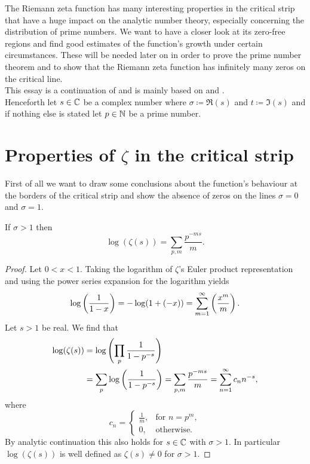 The Riemann zeta function has many interesting properties in the critical strip that have a huge impact on the analytic number theory, especially concerning the distribution of prime numbers. We want to have a closer look at its zero-free regions and find good estimates of the function's growth under certain circumstances. These will be needed later on in order to prove the prime number theorem and to show that the Riemann zeta function has infinitely many zeros on the critical line. \\
This essay is a continuation of \cite{Jesacher2016} and is mainly based on \cite{Stein2003} and \cite{Titchmarsh1986}. \\
Henceforth let $s \in \mathbb{C}$ be a complex number where $\sigma \coloneqq \Re(s)$ and $t \coloneqq \Im(s)$ and if nothing else is stated let $p \in \mathbb{N}$ be a prime number.


\section{Properties of $\zeta$ in the critical strip}
First of all we want to draw some conclusions about the function's behaviour at the borders of the critical strip and show the absence of zeros on the lines $\sigma = 0$ and $\sigma = 1$.


\begin{lemma}\label{lem:LogEulerProd}
	If $\sigma > 1$ then
\begin{equation*}
	\log(\zeta(s)) = \sum _{p,m} \frac{p^{-ms}}{m}.
\end{equation*}
\end{lemma}
\begin{proof}
	Let $0 < x < 1$. Taking the logarithm of $\zeta$'s Euler product representation and using the power series expansion for the logarithm yields
\begin{equation*}
	\log\left(\frac{1}{1 - x}\right) = -\log(1 + (-x)) = \sum _{m = 1} ^\infty \left(\frac{x^m}{m}\right).
\end{equation*}
	Let $s > 1$ be real. We find that
\begin{equation*}
\begin{aligned}	
	\log(\zeta(s)) 
		&= \log\left(\prod _p \frac{1}{1 - p^{-s}}\right) \\
		&= \sum _p \log\left(\frac{1}{1 - p^{-s}}\right)
		= \sum _{p,m} \frac{p^{-ms}}{m} = \sum _{n=1} ^{\infty} c_n n^{-s},
\end{aligned}
\end{equation*}
	where
\begin{equation*}
    c_n =
    \left\{
    	\begin{array}{ll}
        	\frac{1}{m}, & \text{for } n = p^m, \\
        	0, & \text{otherwise.}
        \end{array}
	\right.
\end{equation*}
	By analytic continuation this also holds for $s \in \mathbb{C}$ with $\sigma > 1$. In particular $\log(\zeta(s))$ is well defined as $\zeta(s) \neq 0$ for $\sigma > 1$.
\end{proof}


